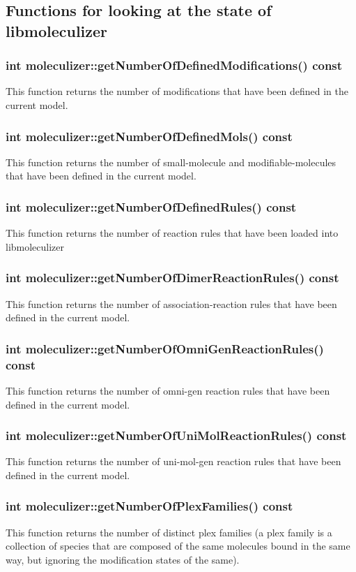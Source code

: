 \subsection{Functions for looking at the state of libmoleculizer}

\subsubsection{int moleculizer::getNumberOfDefinedModifications() const}
This function returns the number of modifications that have been
defined in the current model.

\subsubsection{int moleculizer::getNumberOfDefinedMols() const}
This function returns the number of small-molecule and
modifiable-molecules that have been defined in the current model.

\subsubsection{int moleculizer::getNumberOfDefinedRules() const}
This function returns the number of reaction rules that have been
loaded into libmoleculizer

\subsubsection{int moleculizer::getNumberOfDimerReactionRules() const}
This function returns the number of association-reaction rules that
have been defined in the current model.

\subsubsection{int moleculizer::getNumberOfOmniGenReactionRules() const}
This function returns the number of omni-gen reaction rules that have
been defined in the current model.

\subsubsection{int moleculizer::getNumberOfUniMolReactionRules() const}
This function returns the number of uni-mol-gen reaction rules that
have been defined in the current model.

\subsubsection{int moleculizer::getNumberOfPlexFamilies() const}
This function returns the number of distinct plex families (a plex
family is a collection of species that are composed of the same
molecules bound in the same way, but ignoring the modification states
of the same).

